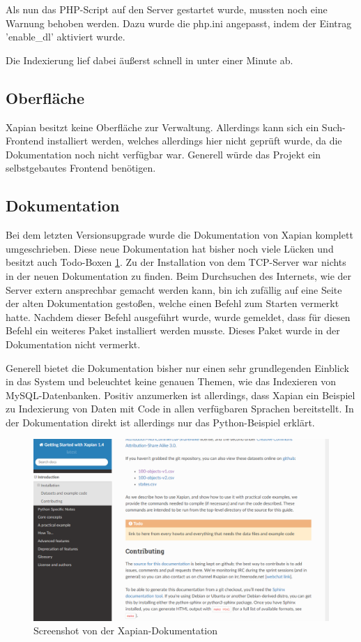 Als nun das PHP-Script auf den Server gestartet wurde, mussten noch eine Warnung behoben werden. Dazu wurde die php.ini angepasst, indem der Eintrag 'enable\_dl' aktiviert wurde. 

Die Indexierung lief dabei äußerst schnell in unter einer Minute ab.

\subsection{Oberfläche}

Xapian besitzt keine Oberfläche zur Verwaltung. Allerdings kann sich ein Such-Frontend installiert werden, welches allerdings hier nicht geprüft wurde, da die Dokumentation noch nicht verfügbar war. Generell würde das Projekt ein selbstgebautes Frontend benötigen.

\subsection{Dokumentation}

Bei dem letzten Versionsupgrade wurde die Dokumentation von Xapian komplett umgeschrieben. Diese neue Dokumentation hat bisher noch viele Lücken und besitzt auch Todo-Boxen \ref{img:xapianDoku}.
Zu der Installation von dem TCP-Server war nichts in der neuen Dokumentation zu finden. Beim Durchsuchen des Internets, wie der Server extern ansprechbar gemacht werden kann, bin ich zufällig auf eine Seite der alten Dokumentation gestoßen, welche einen Befehl zum Starten vermerkt hatte. Nachdem dieser Befehl ausgeführt wurde, wurde gemeldet, dass für diesen Befehl ein weiteres Paket installiert werden musste. Dieses Paket wurde in der Dokumentation nicht vermerkt. 

Generell bietet die Dokumentation bisher nur einen sehr grundlegenden Einblick in das System und beleuchtet keine genauen Themen, wie das Indexieren von MySQL-Datenbanken. Positiv anzumerken ist allerdings, dass Xapian ein Beispiel zu Indexierung von Daten mit Code in allen verfügbaren Sprachen bereitstellt. In der Dokumentation direkt ist allerdings nur das Python-Beispiel erklärt.

\begin{figure}
	\centering
	\includegraphics[width=1\linewidth]{images/xapian_doku.png}
	\caption{Screenshot von der Xapian-Dokumentation}
	\label{img:xapianDoku}
\end{figure}

